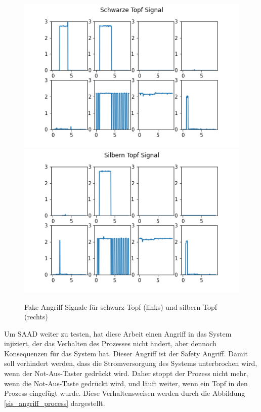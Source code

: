 \documentclass[12pt,a4paper]{scrartcl}
\numberwithin{equation}{section}
\begin{document}
\begin{figure}[ht!]
	\centering
	  \includegraphics[scale=0.5]{fake_angriff_black.png}
	  \includegraphics[scale=0.5]{fake_angriff_silver.png}
	  \caption{Fake Angriff Signale für schwarz Topf (links) und silbern Topf (rechts)}
	\label{fake}
\end{figure}

Um SAAD weiter zu testen, hat diese Arbeit einen Angriff in das System injiziert, der das Verhalten des Prozesses nicht ändert, aber dennoch Konsequenzen für das System hat. Dieser Angriff ist der Safety Angriff. Damit soll verhindert werden, dass die Stromversorgung des Systems unterbrochen wird, wenn der Not-Aus-Taster gedrückt wird. Daher stoppt der Prozess nicht mehr, wenn die Not-Aus-Taste gedrückt wird, und läuft weiter, wenn ein Topf in den Prozess eingefügt wurde. Diese Verhaltensweisen werden durch die Abbildung \ref{sis_angriff_process} dargestellt.
\end{document}
